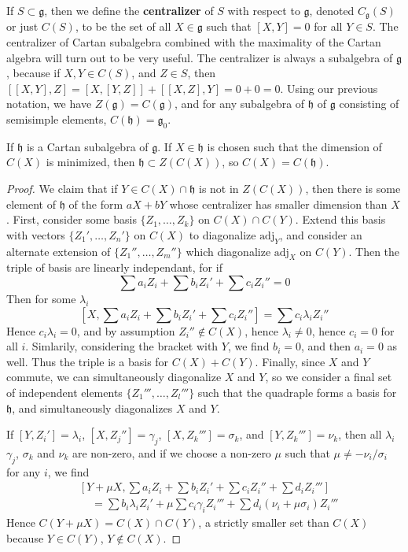 If $S \subset \mathfrak{g}$, then we define the {\bf centralizer} of $S$ with respect to $\mathfrak{g}$, denoted $C_\mathfrak{g}(S)$ or just $C(S)$, to be the set of all $X \in \mathfrak{g}$ such that $[X,Y] = 0$ for all $Y \in S$. The centralizer of Cartan subalgebra combined with the maximality of the Cartan algebra will turn out to be very useful. The centralizer is always a subalgebra of $\mathfrak{g}$, because if $X,Y \in C(S)$, and $Z \in S$, then $[[X,Y],Z] = [X,[Y,Z]] + [[X,Z],Y] = 0 + 0 = 0$. Using our previous notation, we have $Z(\mathfrak{g}) = C(\mathfrak{g})$, and for any subalgebra of $\mathfrak{h}$ of $\mathfrak{g}$ consisting of semisimple elements, $C(\mathfrak{h}) = \mathfrak{g}_0$.

\begin{lemma}
    If $\mathfrak{h}$ is a Cartan subalgebra of $\mathfrak{g}$. If $X \in \mathfrak{h}$ is chosen such that the dimension of $C(X)$ is minimized, then $\mathfrak{h} \subset Z(C(X))$, so $C(X) = C(\mathfrak{h})$.
\end{lemma}
\begin{proof}
    We claim that if $Y \in C(X) \cap \mathfrak{h}$ is not in $Z(C(X))$, then there is some element of $\mathfrak{h}$ of the form $aX + bY$ whose centralizer has smaller dimension than $X$. First, consider some basis $\{ Z_1, \dots, Z_k \}$ on $C(X) \cap C(Y)$. Extend this basis with vectors $\{ Z_1', \dots, Z_n' \}$ on $C(X)$ to diagonalize $\text{adj}_Y$, and consider an alternate extension of $\{ Z_1'', \dots, Z_m'' \}$ which diagonalize $\text{adj}_X$ on $C(Y)$. Then the triple of basis are linearly independant, for if
    \[ \sum a_i Z_i + \sum b_i Z_i' + \sum c_i Z_i'' = 0 \]
    Then for some $\lambda_i$
    \[ \left[ X, \sum a_i Z_i + \sum b_i Z_i' + \sum c_i Z_i'' \right] = \sum c_i \lambda_i Z_i'' \]
    Hence $c_i \lambda_i = 0$, and by assumption $Z_i'' \not \in C(X)$, hence $\lambda_i \neq 0$, hence $c_i = 0$ for all $i$. Simlarily, considering the bracket with $Y$, we find $b_i = 0$, and then $a_i = 0$ as well. Thus the triple is a basis for $C(X) + C(Y)$. Finally, since $X$ and $Y$ commute, we can simultaneously diagonalize $X$ and $Y$, so we consider a final set of independent elements $\{ Z_1''', \dots, Z_l''' \}$ such that the quadraple forms a basis for $\mathfrak{h}$, and simultaneously diagonalizes $X$ and $Y$.

    If $[Y,Z_i'] = \lambda_i$, $[X,Z_j''] = \gamma_j$, $[X,Z_k'''] = \sigma_k$, and $[Y,Z_k'''] = \nu_k$, then all $\lambda_i$ $\gamma_j$, $\sigma_k$ and $\nu_k$ are non-zero, and if we choose a non-zero $\mu$ such that $\mu \neq - \nu_i/\sigma_i$ for any $i$, we find
    \begin{align*}
        &\left[ Y + \mu X, \sum a_i Z_i + \sum b_i Z_i' + \sum c_i Z_i'' + \sum d_i Z_i''' \right]\\
        &\ \ \ \ \ = \sum b_i \lambda_i Z_i' + \mu \sum c_i \gamma_i Z_i''' + \sum d_i \left( \nu_i + \mu \sigma_i \right) Z_i'''
    \end{align*}
    Hence $C(Y + \mu X) = C(X) \cap C(Y)$, a strictly smaller set than $C(X)$ because $Y \in C(Y)$, $Y \not \in C(X)$.
\end{proof}

